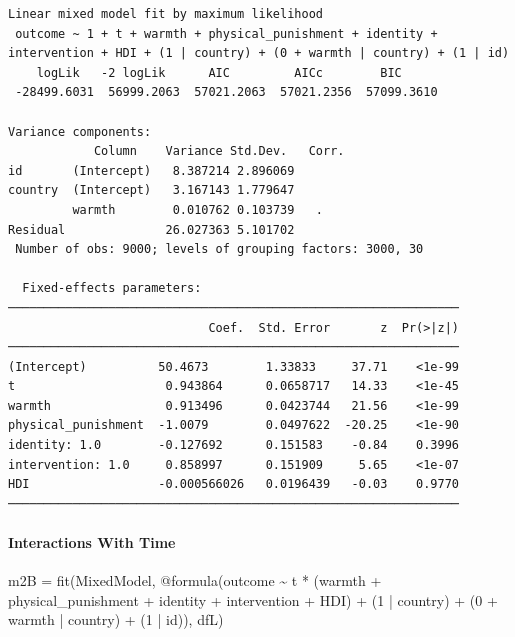\documentclass[
  letterpaper,
  DIV=11,
  numbers=noendperiod]{scrreprt}
\let\oldparagraph\paragraph
\renewcommand{\paragraph}[1]{\oldparagraph{#1}\mbox{}}
\newenvironment{Shaded}{\begin{snugshade}}{\end{snugshade}}
\newcommand{\FloatTok}[1]{\textcolor[rgb]{0.68,0.00,0.00}{#1}}
\newcommand{\FunctionTok}[1]{\textcolor[rgb]{0.28,0.35,0.67}{#1}}
\newcommand{\NormalTok}[1]{\textcolor[rgb]{0.00,0.23,0.31}{#1}}
\newcommand{\OperatorTok}[1]{\textcolor[rgb]{0.37,0.37,0.37}{#1}}
\newcommand{\PreprocessorTok}[1]{\textcolor[rgb]{0.68,0.00,0.00}{#1}}
\begin{document}
\begin{verbatim}
Linear mixed model fit by maximum likelihood
 outcome ~ 1 + t + warmth + physical_punishment + identity + intervention + HDI + (1 | country) + (0 + warmth | country) + (1 | id)
    logLik   -2 logLik      AIC         AICc        BIC     
 -28499.6031  56999.2063  57021.2063  57021.2356  57099.3610

Variance components:
            Column    Variance Std.Dev.   Corr.
id       (Intercept)   8.387214 2.896069
country  (Intercept)   3.167143 1.779647
         warmth        0.010762 0.103739   .  
Residual              26.027363 5.101702
 Number of obs: 9000; levels of grouping factors: 3000, 30

  Fixed-effects parameters:
───────────────────────────────────────────────────────────────
                            Coef.  Std. Error       z  Pr(>|z|)
───────────────────────────────────────────────────────────────
(Intercept)          50.4673        1.33833     37.71    <1e-99
t                     0.943864      0.0658717   14.33    <1e-45
warmth                0.913496      0.0423744   21.56    <1e-99
physical_punishment  -1.0079        0.0497622  -20.25    <1e-90
identity: 1.0        -0.127692      0.151583    -0.84    0.3996
intervention: 1.0     0.858997      0.151909     5.65    <1e-07
HDI                  -0.000566026   0.0196439   -0.03    0.9770
───────────────────────────────────────────────────────────────
\end{verbatim}

\paragraph{Interactions With Time}\label{interactions-with-time-2}

\begin{Shaded}
\begin{Highlighting}[]
\NormalTok{m2B }\OperatorTok{=} \FunctionTok{fit}\NormalTok{(MixedModel, }\PreprocessorTok{@formula}\NormalTok{(outcome }\OperatorTok{\textasciitilde{}}\NormalTok{ t }\OperatorTok{*}\NormalTok{ (warmth }\OperatorTok{+} 
\NormalTok{                                 physical\_punishment }\OperatorTok{+} 
\NormalTok{                                 identity }\OperatorTok{+}\NormalTok{ intervention }\OperatorTok{+} 
\NormalTok{                                   HDI) }\OperatorTok{+}
\NormalTok{                                 (}\FloatTok{1} \OperatorTok{|}\NormalTok{ country) }\OperatorTok{+}
\NormalTok{                                 (}\FloatTok{0} \OperatorTok{+}\NormalTok{ warmth }\OperatorTok{|}\NormalTok{ country) }\OperatorTok{+}
\NormalTok{                                 (}\FloatTok{1} \OperatorTok{|}\NormalTok{ id)), dfL)}
\end{Highlighting}
\end{Shaded}
\end{document}
